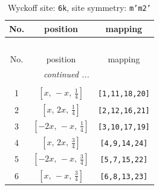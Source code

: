 \documentclass[fleqn,8pt]{jsarticle}
\begin{document}
\renewcommand{\arraystretch}{1.2}
\begin{longtable}{ccc}
\caption{Wyckoff site: {\tt 6k}, site symmetry: {\tt m'm2'}}
 \\
 \hline \hline
No. & position & mapping \\ \hline \endfirsthead

\multicolumn{2}{l}{\tablename\ \thetable{}} \\
 \hline \hline
No. & position & mapping \\ \hline \endhead

 \hline \hline
\multicolumn{2}{r}{\footnotesize\it continued ...} \\ \endfoot

 \hline \hline
\multicolumn{2}{r}{} \\ \endlastfoot

1 & $\left[ x,\, - x,\, \frac{1}{4} \right]$ & {\tt [1,11,18,20]} \\ \hline
2 & $\left[ x,\, 2 x,\, \frac{1}{4} \right]$ & {\tt [2,12,16,21]} \\ \hline
3 & $\left[ - 2 x,\, - x,\, \frac{1}{4} \right]$ & {\tt [3,10,17,19]} \\ \hline
4 & $\left[ x,\, 2 x,\, \frac{3}{4} \right]$ & {\tt [4,9,14,24]} \\ \hline
5 & $\left[ - 2 x,\, - x,\, \frac{3}{4} \right]$ & {\tt [5,7,15,22]} \\ \hline
6 & $\left[ x,\, - x,\, \frac{3}{4} \right]$ & {\tt [6,8,13,23]} \\
\end{longtable}
\renewcommand{\arraystretch}{1.2}
\end{document}
